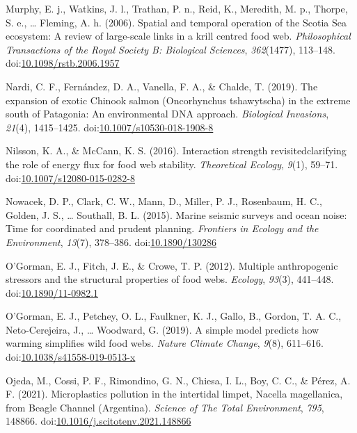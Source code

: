 \documentclass[
]{article}
\newlength{\cslhangindent}
\newenvironment{CSLReferences}[2] %
 {\begin{list}{}{%
  \setlength{\itemindent}{0pt}
  \setlength{\leftmargin}{0pt}
  \setlength{\parsep}{0pt}
  \ifodd #1
   \setlength{\leftmargin}{\cslhangindent}
   \setlength{\itemindent}{-1\cslhangindent}
  \fi
  \setlength{\itemsep}{#2\baselineskip}}}
 {\end{list}}
\begin{document}
\begin{CSLReferences}{1}{0}
Murphy, E. j., Watkins, J. l., Trathan, P. n., Reid, K., Meredith, M.
p., Thorpe, S. e., \ldots{} Fleming, A. h. (2006). Spatial and temporal
operation of the {Scotia Sea} ecosystem: A review of large-scale links
in a krill centred food web. \emph{Philosophical Transactions of the
Royal Society B: Biological Sciences}, \emph{362}(1477), 113--148.
doi:\href{https://doi.org/10.1098/rstb.2006.1957}{10.1098/rstb.2006.1957}

Nardi, C. F., Fernández, D. A., Vanella, F. A., \& Chalde, T. (2019).
The expansion of exotic {Chinook} salmon ({Oncorhynchus} tshawytscha) in
the extreme south of {Patagonia}: An environmental {DNA} approach.
\emph{Biological Invasions}, \emph{21}(4), 1415--1425.
doi:\href{https://doi.org/10.1007/s10530-018-1908-8}{10.1007/s10530-018-1908-8}

Nilsson, K. A., \& McCann, K. S. (2016). Interaction strength
revisited\textemdash clarifying the role of energy flux for food web
stability. \emph{Theoretical Ecology}, \emph{9}(1), 59--71.
doi:\href{https://doi.org/10.1007/s12080-015-0282-8}{10.1007/s12080-015-0282-8}

Nowacek, D. P., Clark, C. W., Mann, D., Miller, P. J., Rosenbaum, H. C.,
Golden, J. S., \ldots{} Southall, B. L. (2015). Marine seismic surveys
and ocean noise: Time for coordinated and prudent planning.
\emph{Frontiers in Ecology and the Environment}, \emph{13}(7), 378--386.
doi:\href{https://doi.org/10.1890/130286}{10.1890/130286}

O'Gorman, E. J., Fitch, J. E., \& Crowe, T. P. (2012). Multiple
anthropogenic stressors and the structural properties of food webs.
\emph{Ecology}, \emph{93}(3), 441--448.
doi:\href{https://doi.org/10.1890/11-0982.1}{10.1890/11-0982.1}

O'Gorman, E. J., Petchey, O. L., Faulkner, K. J., Gallo, B., Gordon, T.
A. C., Neto-Cerejeira, J., \ldots{} Woodward, G. (2019). A simple model
predicts how warming simplifies wild food webs. \emph{Nature Climate
Change}, \emph{9}(8), 611--616.
doi:\href{https://doi.org/10.1038/s41558-019-0513-x}{10.1038/s41558-019-0513-x}

Ojeda, M., Cossi, P. F., Rimondino, G. N., Chiesa, I. L., Boy, C. C., \&
Pérez, A. F. (2021). Microplastics pollution in the intertidal limpet,
{Nacella} magellanica, from {Beagle Channel} ({Argentina}).
\emph{Science of The Total Environment}, \emph{795}, 148866.
doi:\href{https://doi.org/10.1016/j.scitotenv.2021.148866}{10.1016/j.scitotenv.2021.148866}


\end{CSLReferences}
\end{document}
